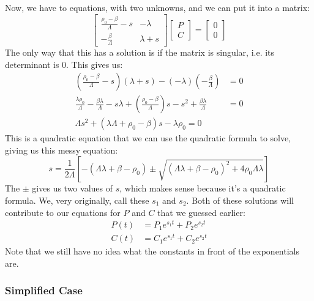 \documentclass[letter]{article}
\begin{document}
Now, we have to equations, with two unknowns, and we can put it into a matrix:
\begin{equation*}
\begin{bmatrix}
  \frac{\rho_0-\beta}{\Lambda}-s & -\lambda \\
  -\frac{\beta}{\Lambda} & \lambda + s
\end{bmatrix}
\begin{bmatrix}
  P \\ C
\end{bmatrix}
=
\begin{bmatrix}
  0 \\ 0
\end{bmatrix}
\end{equation*}
The only way that this has a solution is if the matrix is singular,
i.e. its determinant is 0. This gives us:
\begin{equation*}
  \begin{split}
    \left(\frac{\rho_0-\beta}{\Lambda}-s\right)(\lambda +
    s)-(-\lambda)\left(-\frac{\beta}{\Lambda}\right) &= 0 \\
    \frac{\lambda\rho_0}{\Lambda} -
    \frac{\beta\lambda}{\Lambda}-s\lambda +
    \left(\frac{\rho_0-\beta}{\Lambda}\right)s-s^2+\frac{\beta\lambda}{\Lambda}
    &= 0 \\
    \Lambda{}s^2+(\lambda\Lambda+\rho_0-\beta)s-\lambda\rho_0=0
  \end{split}
\end{equation*}
This is a quadratic equation that we can use the quadratic formula to
solve, giving us this messy equation:
\begin{equation*}
  s=\frac{1}{2\Lambda}\left[-(\Lambda\lambda+\beta-\rho_0) \pm \sqrt{(\Lambda\lambda+\beta-\rho_0)^2+4\rho_0\Lambda\lambda}\right]
\end{equation*}
The $\pm$ gives us two values of $s$, which makes sense because it's a
quadratic formula. We, very originally, call these $s_1$ and
$s_2$. Both of these solutions will contribute to our equations for
$P$ and $C$ that we guessed earlier:
\begin{equation*}
  \begin{split}
    P(t)&=P_1e^{s_1t}+P_2e^{s_2t} \\
    C(t)&=C_1e^{s_1t}+C_2e^{s_2t}
  \end{split}
\end{equation*}
Note that we still have no idea what the constants in front of the
exponentials are.

\subsubsection{Simplified Case}
\end{document}
